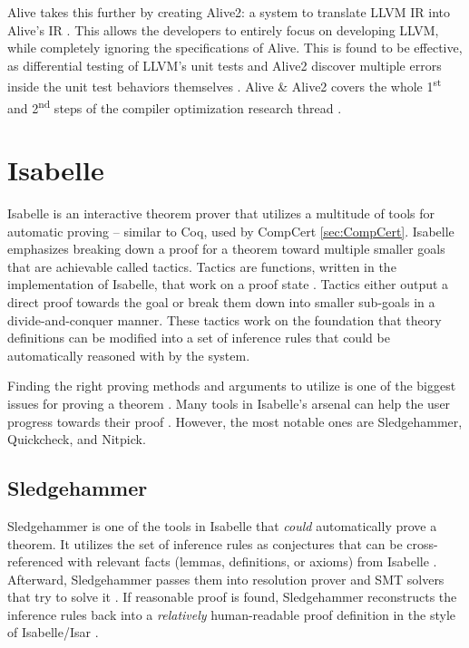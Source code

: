 Alive takes this further by creating Alive2: a system to translate LLVM IR into Alive's IR \cite{Alive2}. This allows the developers to entirely 
focus on developing LLVM, while completely ignoring the specifications of Alive. This is found to be effective, as differential testing of 
LLVM's unit tests and Alive2 discover multiple errors inside the unit test behaviors themselves \cite[Sec. 8.2]{Alive2}. Alive \& Alive2 covers 
the whole 1\textsuperscript{st} and 2\textsuperscript{nd} steps of the compiler optimization research thread \cite[p. 5]{CompilerOptimization}.

\section{Isabelle}
\label{sec:Isabelle}

Isabelle is an interactive theorem prover that utilizes a multitude of tools for automatic proving -- similar to Coq, used by CompCert 
\ref{sec:CompCert}. Isabelle emphasizes breaking down a proof 
for a theorem toward multiple smaller goals that are achievable called tactics. Tactics are functions, written in the implementation of Isabelle, 
that work on a proof state \cite{isabelleProof}. Tactics either output a direct proof towards the goal or break them down into smaller sub-goals 
in a divide-and-conquer manner. These tactics work on the foundation that theory definitions can be modified into a set of inference rules that 
could be automatically reasoned with by the system.

Finding the right proving methods and arguments to utilize is one of the biggest issues for proving a theorem \cite{isabelleProof}. 
Many tools in Isabelle's arsenal can help the user progress towards their proof \cite{IsabelleHOL}. However, the most notable ones are 
Sledgehammer, Quickcheck, and Nitpick.

\subsection{Sledgehammer}
\label{sec:Sledgehammer}

Sledgehammer is one of the tools in Isabelle that \emph{could} automatically prove a theorem. It utilizes the set of inference rules as 
conjectures that can be cross-referenced with relevant facts (lemmas, definitions, or axioms) from Isabelle \cite[Sec. 3]{isabelleProof}. 
Afterward, Sledgehammer passes them into resolution prover and SMT solvers that try to solve it \cite[Sec. 3.3]{isabelleProof}. If reasonable 
proof is found, Sledgehammer reconstructs the inference rules back into a \emph{relatively} human-readable proof definition in the style of 
Isabelle/Isar \cite[Sec. 3.4]{isabelleProof}.

